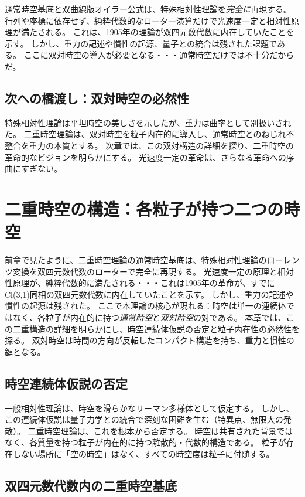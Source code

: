 \documentclass[dvipdfmx,a4paper]{jsbook}
\theoremstyle{definition}
\theoremstyle{remark}
\begin{document}
通常時空基底と双曲線版オイラー公式は、特殊相対性理論を\emph{完全に}再現する。
行列や座標に依存せず、純粋代数的なローター演算だけで光速度一定と相対性原理が満たされる。
これは、1905年の理論が双四元数代数に内在していたことを示す。
しかし、重力の記述や慣性の起源、量子との統合は残された課題である。
ここに双対時空の導入が必要となる・・・通常時空だけでは不十分だからだ。

\section{次への橋渡し：双対時空の必然性}
\label{sec:to-dual-spacetime}

特殊相対性理論は平坦時空の美しさを示したが、重力は曲率として別扱いされた。
二重時空理論は、双対時空を粒子内在的に導入し、通常時空とのねじれ不整合を重力の本質とする。
次章では、この双対構造の詳細を探り、二重時空の革命的なビジョンを明らかにする。
光速度一定の革命は、さらなる革命への序曲にすぎない。

\chapter{二重時空の構造：各粒子が持つ二つの時空}
\label{chap:double-spacetime-structure}

前章で見たように、二重時空理論の通常時空基底は、特殊相対性理論のローレンツ変換を双四元数代数のローターで完全に再現する。
光速度一定の原理と相対性原理が、純粋代数的に満たされる・・・これは1905年の革命が、すでにCl(3,1)同相の双四元数代数に内在していたことを示す。
しかし、重力の記述や慣性の起源は残された。
ここで本理論の核心が現れる：時空は単一の連続体ではなく、各粒子が内在的に持つ\emph{通常時空}と\emph{双対時空}の対である。
本章では、この二重構造の詳細を明らかにし、時空連続体仮説の否定と粒子内在性の必然性を探る。
双対時空は時間の方向が反転したコンパクト構造を持ち、重力と慣性の鍵となる。

\section{時空連続体仮説の否定}
\label{sec:continuum-denial}

一般相対性理論は、時空を滑らかなリーマン多様体として仮定する。
しかし、この連続体仮説は量子力学との統合で深刻な困難を生む（特異点、無限大の発散）。
二重時空理論は、これを根本から否定する。
時空は共有された背景ではなく、各質量を持つ粒子が内在的に持つ離散的・代数的構造である。
粒子が存在しない場所に「空の時空」はなく、すべての時空度は粒子に付随する。

\section{双四元数代数内の二重時空基底}
\label{sec:biquaternion-basis}
\end{document}
